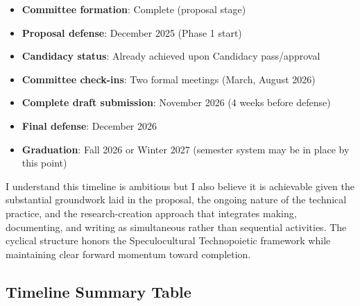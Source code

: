\begin{itemize}[noitemsep]
	\item \textbf{Committee formation}: Complete (proposal stage)
	\item \textbf{Proposal defense}: December 2025 (Phase 1 start)
	\item \textbf{Candidacy status}: Already achieved upon Candidacy pass/approval
	\item \textbf{Committee check-ins}: Two formal meetings (March, August 2026)
	\item \textbf{Complete draft submission}: November 2026 (4 weeks before defense)
	\item \textbf{Final defense}: December 2026
	\item \textbf{Graduation}: Fall 2026 or Winter 2027 (semester system may be in place by this point)
\end{itemize}

I understand this timeline is ambitious but I also believe it is achievable given the substantial groundwork laid in the proposal, the ongoing nature of the technical practice, and the research-creation approach that integrates making, documenting, and writing as simultaneous rather than sequential activities. The cyclical structure honors the Speculocultural Technopoietic framework while maintaining clear forward momentum toward completion.

\subsection*{Timeline Summary Table}

